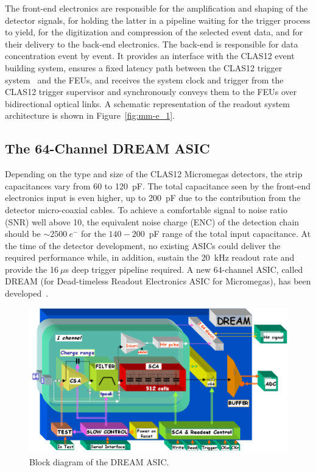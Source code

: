 The front-end electronics are responsible for the amplification and shaping of the detector signals, for holding the latter in a
pipeline waiting for the trigger process to yield, for the digitization and compression of the selected event data, and for their
delivery to the back-end electronics. The back-end is responsible for data concentration event by event. It provides an interface
with the CLAS12 event building system, ensures a fixed latency path between the CLAS12 trigger system~\cite{trigger-nim} 
and the FEUs, and receives the system clock and trigger from the CLAS12 trigger supervisor and synchronously conveys 
them to the FEUs over bidirectional optical links. A schematic representation of the readout system architecture is 
shown in Figure~\ref{fig:mm-e_1}.

\subsection{The 64-Channel DREAM ASIC}

Depending on the type and size of the CLAS12 Micromegas detectors, the strip capacitances vary from 60 to 120~pF. The total
capacitance seen by the front-end electronics input is even higher, up to 200~pF due to the contribution from the detector
micro-coaxial cables. To achieve a comfortable signal to noise ratio (SNR) well above 10, the equivalent noise charge (ENC) of the
detection chain should be $\sim2500~e^-$ for the $140-200$~pF range of the total input capacitance. At the time of the
detector development, no existing ASICs could deliver the required performance while, in addition, sustain the 20~kHz readout
rate and provide the 16$~\mu$s deep trigger pipeline required. A new 64-channel ASIC, called DREAM (for Dead-timeless
Readout Electronics ASIC for Micromegas), has been developed~\cite{DRM}. 

\begin{figure}[htb]
 \includegraphics[width=1.0\columnwidth,keepaspectratio]{images/electronics_fig2.png}
 \caption{Block diagram of the DREAM ASIC.}
 \label{fig:mm-e_2}
\end{figure}

